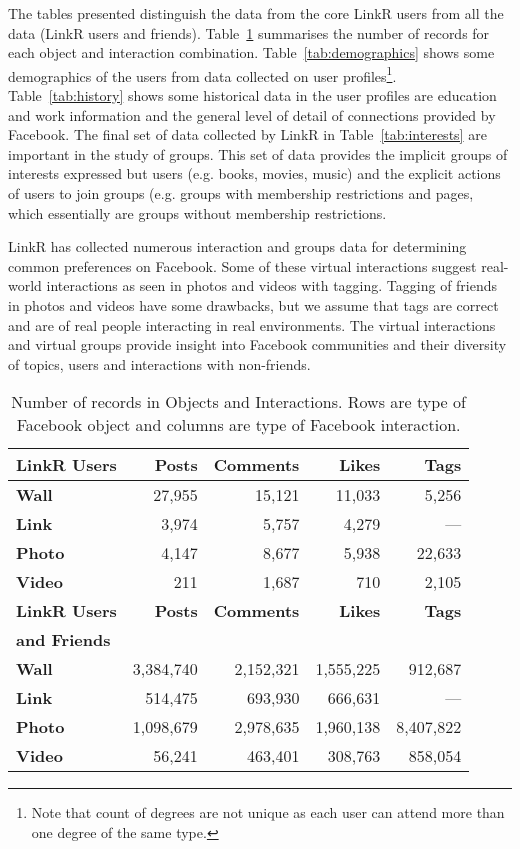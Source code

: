 The tables presented distinguish the data from the core LinkR users from all the data (LinkR users and friends). Table~\ref{tab:interactions} summarises the number of records for each object and interaction combination. Table~\ref{tab:demographics} shows some demographics of the users from data collected on user profiles\footnote{Note that count of degrees are not unique as each user can attend more than one degree of the same type.}. Table~\ref{tab:history} shows some historical data in the user profiles are education and work information and the general level of detail of connections provided by Facebook. The final set of data collected by LinkR in Table~\ref{tab:interests} are important in the study of groups. This set of data provides the implicit groups of interests expressed but users (e.g. books, movies, music) and the explicit actions of users to join groups (e.g. groups with membership restrictions and pages, which essentially are groups without membership restrictions.

LinkR has collected numerous interaction and groups data for determining common preferences on Facebook. Some of these virtual interactions suggest real-world interactions as seen in photos and videos with tagging. Tagging of friends in photos and videos have some drawbacks, but we assume that tags are correct and are of real people interacting in real environments. The virtual interactions and virtual groups provide insight into Facebook communities and their diversity of topics, users and interactions with non-friends.


\begin{table}[p]
\centering
\caption{\small Number of records in Objects and Interactions. Rows are type of Facebook object and columns are type of Facebook interaction.}
\label{tab:interactions}
\begin{tabular}{|>{\small}l|>{\small}r|>{\small}r|>{\small}r|>{\small}r|}
\hline
\textbf{LinkR Users} & \textbf{Posts} & \textbf{Comments} & \textbf{Likes} & \textbf{Tags} \\
\hline
\textbf{Wall} & 27,955 & 15,121 & 11,033 & 5,256 \\
\hline
\textbf{Link} & 3,974 & 5,757 & 4,279 & --- \\
\hline
\textbf{Photo} & 4,147 & 8,677 & 5,938 & 22,633 \\
\hline
\textbf{Video} & 211 & 1,687 & 710 & 2,105 \\
\hline
\hline
\textbf{LinkR Users} & \textbf{Posts} & \textbf{Comments} & \textbf{Likes} & \textbf{Tags} \\
\textbf{and Friends} & & & & \\
\hline
\textbf{Wall} & 3,384,740 & 2,152,321 & 1,555,225 & 912,687 \\
\hline
\textbf{Link} & 514,475 & 693,930 & 666,631 & --- \\
\hline
\textbf{Photo} & 1,098,679 & 2,978,635 & 1,960,138 & 8,407,822 \\
\hline
\textbf{Video} & 56,241 & 463,401 & 308,763 & 858,054 \\
\hline
\end{tabular}
\end{table}




